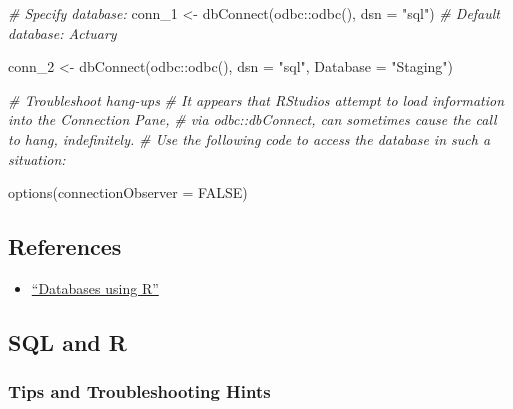 \documentclass[
]{book}
\newenvironment{Shaded}{\begin{snugshade}}{\end{snugshade}}
\newcommand{\AttributeTok}[1]{\textcolor[rgb]{0.77,0.63,0.00}{#1}}
\newcommand{\CommentTok}[1]{\textcolor[rgb]{0.56,0.35,0.01}{\textit{#1}}}
\newcommand{\ConstantTok}[1]{\textcolor[rgb]{0.00,0.00,0.00}{#1}}
\newcommand{\FunctionTok}[1]{\textcolor[rgb]{0.00,0.00,0.00}{#1}}
\newcommand{\NormalTok}[1]{#1}
\newcommand{\OtherTok}[1]{\textcolor[rgb]{0.56,0.35,0.01}{#1}}
\newcommand{\SpecialCharTok}[1]{\textcolor[rgb]{0.00,0.00,0.00}{#1}}
\newcommand{\StringTok}[1]{\textcolor[rgb]{0.31,0.60,0.02}{#1}}
\providecommand{\tightlist}{%
  \setlength{\itemsep}{0pt}\setlength{\parskip}{0pt}}
\begin{document}
\begin{Shaded}
\begin{Highlighting}[]
\CommentTok{\# Specify database:}
\NormalTok{conn\_1 }\OtherTok{\textless{}{-}} \FunctionTok{dbConnect}\NormalTok{(odbc}\SpecialCharTok{::}\FunctionTok{odbc}\NormalTok{(), }\AttributeTok{dsn =} \StringTok{"sql"}\NormalTok{) }\CommentTok{\# Default database: Actuary}

\NormalTok{conn\_2 }\OtherTok{\textless{}{-}} \FunctionTok{dbConnect}\NormalTok{(odbc}\SpecialCharTok{::}\FunctionTok{odbc}\NormalTok{(), }\AttributeTok{dsn =} \StringTok{"sql"}\NormalTok{, }\AttributeTok{Database =} \StringTok{"Staging"}\NormalTok{)}

\CommentTok{\# Troubleshoot hang{-}ups}
\CommentTok{\# It appears that RStudio\textquotesingle{}s attempt to load information into the Connection Pane,}
\CommentTok{\# via \textasciigrave{}odbc::dbConnect\textasciigrave{}, can sometimes cause the call to hang, indefinitely.}
\CommentTok{\# Use the following code to access the database in such a situation:}

\FunctionTok{options}\NormalTok{(}\AttributeTok{connectionObserver =} \ConstantTok{FALSE}\NormalTok{)}
\end{Highlighting}
\end{Shaded}

\hypertarget{references}{%
\subsection{References}\label{references}}

\begin{itemize}
\tightlist
\item
  \href{db.rstudio.com}{``Databases using R''}
\end{itemize}

\hypertarget{sql-and-r}{%
\subsection{SQL and R}\label{sql-and-r}}

\hypertarget{tips-and-troubleshooting-hints}{%
\subsubsection{Tips and Troubleshooting Hints}\label{tips-and-troubleshooting-hints}}
\end{document}
